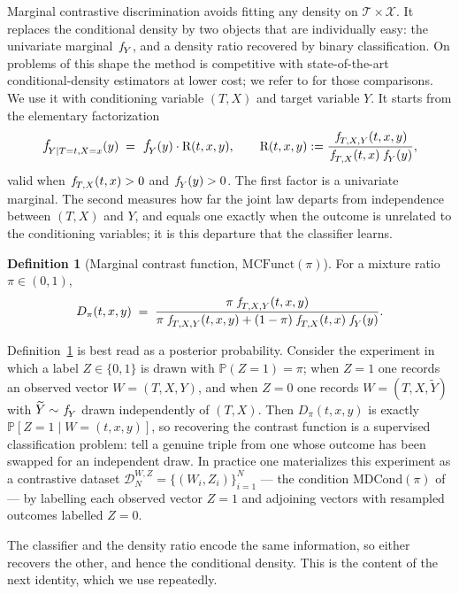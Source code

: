 \documentclass[11pt]{article}
\theoremstyle{plain}
\theoremstyle{definition}
\newtheorem{mydef}{Definition}
\theoremstyle{remark}
\newcommand{\MCF}{\ensuremath{\text{MCFunct}}}
\newcommand{\MDC}{\ensuremath{\text{MDCond}}}
\newcommand{\pP}{\ensuremath{\mathbb{P}}}
\newcommand{\cX}{\ensuremath{\mathcal{X}}}
\newcommand{\cT}{\ensuremath{\mathcal{T}}}
\newcommand{\pf}[1]{\ensuremath{\,\mathlarger{\textit{f}}_{#1}}}
\newcommand{\ratio}{\ensuremath{\pi}}
\newcommand{\contrast}{D_{\ratio}}
\newcommand{\DensityRatio}{\text{R}}
\newcommand{\mDwz}[1]{\ensuremath{\mathcal{D}}_{#1}^{W,Z}}
\begin{document}
Marginal contrastive discrimination avoids fitting any density on $\cT \times \cX$. It
replaces the conditional density by two objects that are individually easy: the univariate
marginal $\pf{Y}$, and a density ratio recovered by binary classification. On problems of
this shape the method is competitive with state-of-the-art conditional-density estimators at
lower cost; we refer to \citet{meziani2025mcd} for those comparisons. We use it with
conditioning variable $(T,X)$ and target variable $Y$. It starts from the elementary
factorization
\begin{equation}
\pf{Y \mid T=t,X=x}(y)
\;=\; \pf{Y}(y) \cdot \DensityRatio(t,x,y),
\qquad
\DensityRatio(t,x,y) := \frac{\pf{T,X,Y}(t,x,y)}{\pf{T,X}(t,x)\,\pf{Y}(y)} ,
\label{eq:reformulation}
\end{equation}
valid when $\pf{T,X}(t,x) > 0$ and $\pf{Y}(y) > 0$. The first factor is a univariate marginal.
The second measures how far the joint law departs from independence between $(T,X)$ and $Y$,
and equals one exactly when the outcome is unrelated to the conditioning variables; it is this
departure that the classifier learns.

\begin{mydef}[Marginal contrast function, $\MCF(\ratio)$]
\label{def:MCF}
For a mixture ratio $\ratio \in (0,1)$,
\begin{equation}
\contrast(t,x,y)
\;=\; \frac{\ratio\,\pf{T,X,Y}(t,x,y)}
{\ratio\,\pf{T,X,Y}(t,x,y) + (1-\ratio)\,\pf{T,X}(t,x)\,\pf{Y}(y)} .
\label{eq:contrast}
\end{equation}
\end{mydef}

Definition~\ref{def:MCF} is best read as a posterior probability. Consider the experiment in
which a label $Z\in\{0,1\}$ is drawn with $\pP(Z=1)=\ratio$; when $Z=1$ one records an
observed vector $W=(T,X,Y)$, and when $Z=0$ one records $W=(T,X,\widetilde Y)$ with
$\widetilde Y \sim \pf{Y}$ drawn independently of $(T,X)$. Then $\contrast(t,x,y)$ is exactly
$\pP[Z=1 \mid W=(t,x,y)]$, so recovering the contrast function is a supervised classification
problem: tell a genuine triple from one whose outcome has been swapped for an independent
draw. In practice one materializes this experiment as a contrastive dataset
$\mDwz{N}=\{(W_i,Z_i)\}_{i=1}^{N}$ --- the condition $\MDC(\ratio)$ of \citet{meziani2025mcd}
--- by labelling each observed vector $Z=1$ and adjoining vectors with resampled outcomes
labelled $Z=0$.

The classifier and the density ratio encode the same information, so either recovers the
other, and hence the conditional density. This is the content of the next identity, which we
use repeatedly.
\end{document}
